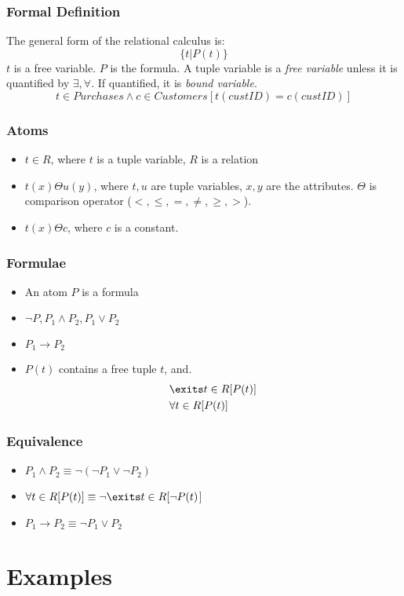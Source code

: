 \documentclass{beamer}
\begin{document}
\begin{frame}
  \frametitle{Formal Definition}
  The general form of the relational calculus is:
  $$
  \{t | P(t)\}
  $$
  $t$ is a free variable. $P$ is the formula. A tuple variable is a \textit{free
variable} unless it is quantified by $\exists, \forall$. If quantified, it is \textit{bound
variable}. 
  $$
  t \in Purchases \wedge c \in Customers [t(custID)=c(custID)]
  $$
\end{frame}

\begin{frame}
  \frametitle{Atoms}
  \begin{itemize}
  \item $t \in R$, where $t$ is a tuple variable, $R$ is a relation
  \item $t(x) \Theta u(y)$, where $t, u$ are tuple variables, $x, y$ are the attributes. $\Theta$ is comparison operator ($<, \leq, =, \neq, \geq, >$).
  \item $t(x) \Theta c$, where $c$ is a constant. 
  \end{itemize}
\end{frame}

\begin{frame}
  \frametitle{Formulae}
  \begin{itemize}
  \item An atom $P$ is a formula
  \item $\neg P, P_1 \wedge P_2, P_1 \vee P_2$
  \item $P_1 \rightarrow P_2$
  \item $P(t)$ contains a free tuple $t$, and.
  \begin{align*}
  &\exits t \in R [P(t)]\\
  &\forall t \in R [P(t)]
  \end{align*}
  \end{itemize}
\end{frame}


\begin{frame}
  \frametitle{Equivalence}
  \begin{itemize}
  \item $P_1 \wedge P_2 \equiv \neg (\neg P_1 \vee \neg P_2)$
  \item $\forall t \in R[P(t)] \equiv \neg \exits t \in R [\neg P(t)$]
  \item $P_1 \rightarrow P_2 \equiv \neg P_1 \vee P_2$
  \end{itemize}
\end{frame}

\section{Examples}
\end{document}

